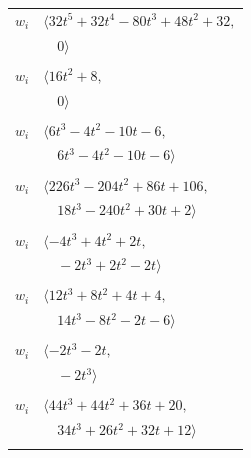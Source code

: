 \documentclass[11pt]{article}
\begin{document}
\begin{longtable}{@{}ll@{}}
$w_i$ & $\langle 32t^{5}+32t^{4}-80t^{3}+48t^{2}+32,$\\
 & $\quad 0\rangle$\\
\addlinespace[2pt]
\multicolumn{2}{@{}p{0.97\textwidth}@{}}{$i=35$, $D_i=4$, $\rho_{ij}$: $6{:}2, \allowbreak 11{:}2, \allowbreak 12{:}1, \allowbreak 21{:}2, \allowbreak 23{:}1, \allowbreak 30{:}1, \allowbreak 32{:}2, \allowbreak 34{:}2$}\\
$w_i$ & $\langle 16t^{2}+8,$\\
 & $\quad 0\rangle$\\
\addlinespace[2pt]
\multicolumn{2}{@{}p{0.97\textwidth}@{}}{$i=36$, $D_i=4$, $\rho_{ij}$: $6{:}1, \allowbreak 10{:}2, \allowbreak 11{:}1, \allowbreak 15{:}1, \allowbreak 19{:}2, \allowbreak 22{:}1, \allowbreak 24{:}1, \allowbreak 27{:}1, \allowbreak 28{:}1, \allowbreak 31{:}2, \allowbreak 38{:}2, \allowbreak 41{:}2$}\\
$w_i$ & $\langle 6t^{3}-4t^{2}-10t-6,$\\
 & $\quad 6t^{3}-4t^{2}-10t-6\rangle$\\
\addlinespace[2pt]
\multicolumn{2}{@{}p{0.97\textwidth}@{}}{$i=37$, $D_i=16$, $\rho_{ij}$: $2{:}2, \allowbreak 3{:}2, \allowbreak 9{:}2, \allowbreak 12{:}1, \allowbreak 16{:}1, \allowbreak 17{:}1, \allowbreak 26{:}2, \allowbreak 29{:}2, \allowbreak 32{:}1, \allowbreak 33{:}2$}\\
$w_i$ & $\langle 226t^{3}-204t^{2}+86t+106,$\\
 & $\quad 18t^{3}-240t^{2}+30t+2\rangle$\\
\addlinespace[2pt]
\multicolumn{2}{@{}p{0.97\textwidth}@{}}{$i=38$, $D_i=2$, $\rho_{ij}$: $4{:}2, \allowbreak 24{:}1, \allowbreak 31{:}1, \allowbreak 32{:}1, \allowbreak 36{:}1$}\\
$w_i$ & $\langle -4t^{3}+4t^{2}+2t,$\\
 & $\quad -2t^{3}+2t^{2}-2t\rangle$\\
\addlinespace[2pt]
\multicolumn{2}{@{}p{0.97\textwidth}@{}}{$i=39$, $D_i=8$, $\rho_{ij}$: $14{:}1, \allowbreak 15{:}2, \allowbreak 26{:}1, \allowbreak 33{:}2, \allowbreak 34{:}1, \allowbreak 40{:}2$}\\
$w_i$ & $\langle 12t^{3}+8t^{2}+4t+4,$\\
 & $\quad 14t^{3}-8t^{2}-2t-6\rangle$\\
\addlinespace[2pt]
\multicolumn{2}{@{}p{0.97\textwidth}@{}}{$i=40$, $D_i=2$, $\rho_{ij}$: $11{:}1, \allowbreak 26{:}1, \allowbreak 39{:}1$}\\
$w_i$ & $\langle -2t^{3}-2t,$\\
 & $\quad -2t^{3}\rangle$\\
\addlinespace[2pt]
\multicolumn{2}{@{}p{0.97\textwidth}@{}}{$i=41$, $D_i=4$, $\rho_{ij}$: $1{:}2, \allowbreak 4{:}1, \allowbreak 6{:}2, \allowbreak 8{:}1, \allowbreak 14{:}1, \allowbreak 18{:}2, \allowbreak 20{:}1, \allowbreak 26{:}1, \allowbreak 36{:}1$}\\
$w_i$ & $\langle 44t^{3}+44t^{2}+36t+20,$\\
 & $\quad 34t^{3}+26t^{2}+32t+12\rangle$\\
\addlinespace[2pt]
\end{longtable}
\endgroup
\end{document}
